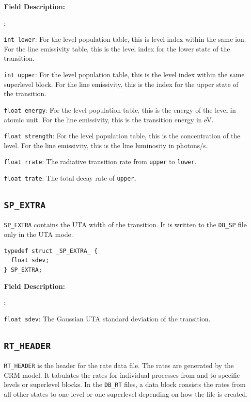 \documentclass[twoside,letterpaper]{refrep}
\newcommand{\key}[1]{\texttt{#1}}
\newenvironment{dbdesc}{\textbf{Field Description:} \begin{list}
	{:}{\setlength{\labelwidth}{2in}
	   \setlength{\leftmargin}{2in}
	   \setlength{\labelsep}{0.1in}
	   \setlength{\rightmargin}{0.2in}}}
	{\end{list}}
\begin{document}
\begin{dbdesc}
\item[\texttt{int lower}:] For the level population table, this is level index
within the same ion. For the line emissivity table, this is the level index for
the lower state of the transition.
\item[\texttt{int upper}:] For the level population table, this is the level
index within the same superlevel block. For the line emissivity, this is the
index for the upper state of the transition.
\item[\texttt{float energy}:] For the level population table, this is the
energy of the level in atomic unit. For the line emissivity, this is the
transition energy in eV.
\item[\texttt{float strength}:] For the level population table, this is the
concentration of the level. For the line emissivity, this is the line
luminosity in photons/s. 
\item[\texttt{float rrate}:] The radiative transition rate from \key{upper} to
  \key{lower}. 
\item[\texttt{float trate}:] The total decay rate of \key{upper}.
\end{dbdesc}

\subsection{\texttt{SP\_EXTRA}}
\texttt{SP\_EXTRA} contains the UTA width of the transition. It is written to
the \texttt{DB\_SP} file only in the UTA mode.

\begin{verbatim}
typedef struct _SP_EXTRA_ {
  float sdev;
} SP_EXTRA;
\end{verbatim}

\begin{dbdesc}
\item[\texttt{float sdev}:] The Gaussian UTA standard deviation of the
  transition.
\end{dbdesc}

\subsection{\texttt{RT\_HEADER}}
\label{subsec:rt_header}
\texttt{RT\_HEADER} is the header for the rate data file. The rates are
generated by the CRM model. It tabulates the rates for individual processes
from and to specific levels or superlevel blocks. In the \texttt{DB\_RT}
files, a data block consists the rates from all other states to one level or
one superlevel depending on how the file is created.
\end{document}
